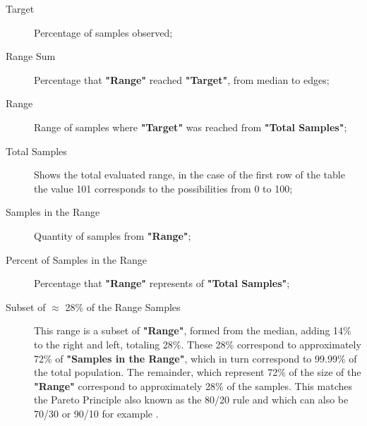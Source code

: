 \vspace{-8mm}
\begin{description}
   \item[Target] Percentage of samples observed;
   \item[Range Sum] Percentage that \textbf{"Range"} reached \textbf{"Target"}, from median to edges;
   \item[Range] Range of samples where \textbf{"Target"} was reached from \textbf{"Total Samples"};
   \item[Total Samples] Shows the total evaluated range, in the case of the first row of the table the value 101 corresponds to the possibilities from 0 to 100;
   \item[Samples in the Range] Quantity of samples from \textbf{"Range"};
   \item[Percent of Samples in the Range] Percentage that \textbf{"Range"} represents of \textbf{"Total Samples"};
   \item[Subset of $\approx$ 28\% of the Range Samples] This range is a subset of \textbf{"Range"}, formed from the median, adding 14\% to the right and left, totaling 28\%. These 28\% correspond to approximately 72\% of \textbf{"Samples in the Range"}, which in turn correspond to 99.99\% of the total population. The remainder, which represent 72\% of the size of the \textbf{"Range"} correspond to approximately 28\% of the samples. This matches the Pareto Principle also known as the 80/20 rule and which can also be 70/30 or 90/10 for example \cite{wiki_pareto_principle}.
\end{description}
\bigbreak

